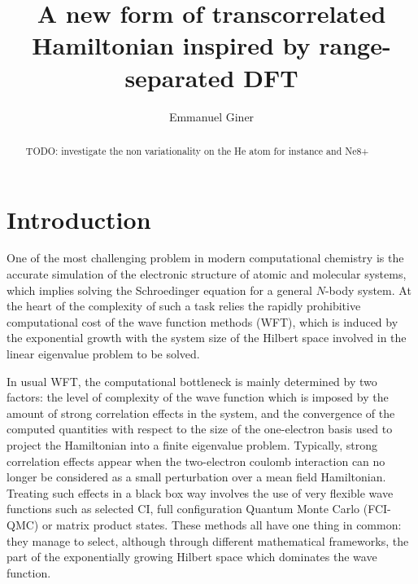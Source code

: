 \documentclass[aip,jcp,reprint,noshowkeys,superscriptaddress]{revtex4-1}
\begin{document}
	

\title{A new form of transcorrelated Hamiltonian inspired by range-separated DFT}

\author{Emmanuel Giner}

\begin{abstract}
TODO: investigate the non variationality on the He atom for instance and Ne8+

\end{abstract}

\maketitle
\section{Introduction}
One of the most challenging problem in modern computational chemistry is the accurate simulation of the electronic structure of atomic and molecular systems, which implies solving the Schroedinger equation for a general $N$-body system. 
At the heart of the complexity of such a task relies the rapidly prohibitive computational cost of the wave function methods (WFT), which is induced by the exponential growth with the system size of the Hilbert space involved in the linear eigenvalue problem to be solved. 

In usual WFT, the computational bottleneck is mainly determined by two factors: the level of complexity of the wave function which is imposed by the amount of strong correlation effects in the system, and the convergence of the computed quantities with respect to the size of the one-electron basis used to project the Hamiltonian into a finite eigenvalue problem. 
Typically, strong correlation effects appear when the two-electron coulomb interaction can no longer be considered as a small perturbation over a mean field Hamiltonian. Treating such effects in a black box way involves the use of very flexible wave functions such as 
selected CI\cite{bender,HurMalRan-JCP-73,buenker1,buenker-book,three_class_CIPSI,harrison,cele_cipsi_3_spaces,cele_cipsi_zeroth_order,GinSceCaf-CJC-13, GinSceCaf-JCP-15, ShaHolJeaAlaUmr-JCTC-17}, 
full configuration Quantum Monte Carlo\cite{BooThoAla-JCP-09,BooAla-JCP-10,BooCleThoAla-JCP-11,GhaLozAla-JCP-19,VitAlaKat-JCTC-20} (FCI-QMC) or matrix product states\cite{ChaSha-AR-11,BaiRei-JCP-20}. These methods all have one thing in common: they manage to select, although through different mathematical frameworks, the part of the exponentially growing Hilbert space which dominates the wave function. 
\end{document}
